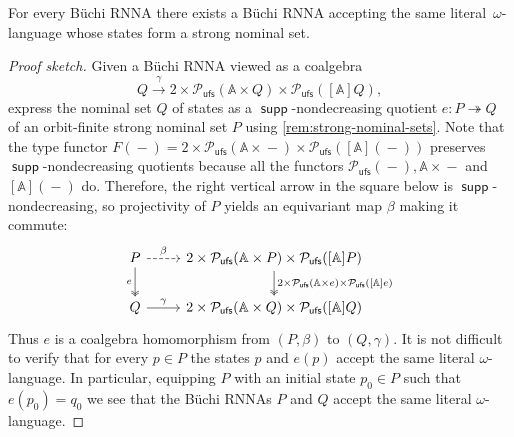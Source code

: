 \documentclass[10pt,a4paper]{amsart}
\numberwithin{equation}{section}
\newcommand{\epito}{\twoheadrightarrow}
\newcommand{\xto}[1]{\xrightarrow{~#1~}}
\newcommand{\dash}{\mathop{-}}
\newcommand{\+}[1]{\mathcal{#1}\xspace}
\newcommand{\Pow}{\mathcal{P}}
\newcommand{\ufs}{{\mathsf{ufs}}}
\newcommand{\names}{\mathbb{A}}
\DeclareMathOperator{\supp}{\mathsf{supp}} %
\theoremstyle{definition}
\begin{document}
%
\begin{proposition}\label{prop:strong}
  For every Büchi RNNA there exists a Büchi RNNA accepting the same
  literal~$\omega$-lan\-guage whose states form a strong
  nominal set.
\end{proposition}
%
\begin{proof}[Proof sketch]
 Given a Büchi RNNA viewed as a coalgebra
    \[
      Q\xto{\gamma} 2\times \Pow_\ufs(\names\times Q)\times
      \Pow_\ufs([\names]Q),
    \]
    express the nominal set $Q$ of states as a $\supp$-nondecreasing
    quotient $e\colon P\epito Q$ of an orbit-finite strong nominal set
    $P$ using \autoref{rem:strong-nominal-sets}. Note that the type
    functor
    $F(\dash) = 2\times \Pow_\ufs(\names\times \dash)\times
    \Pow_\ufs([\names](\dash))$ preserves $\supp$-nondecreasing quotients
    because all the functors
    $\Pow_\ufs(\dash), \names\times \dash$ and $[\names](\dash)$
    do. Therefore, the right vertical arrow in the square below is
    $\supp$-nondecreasing, so projectivity of $P$ yields an equivariant
    map $\beta$ making it commute:
\[
      \begin{tikzcd}
        P \ar[d,"e"', two heads] \ar[dashed]{r}{\beta}
        &
        2\times \Pow_\ufs(\names\times P)\times \Pow_\ufs([\names]P)
        \ar[d,"2\times \Pow_\ufs(\names\times e)\times
        \Pow_\ufs({[\names]}e)", two heads]
        \\
        Q \ar[r,"\gamma"]
        &
        2\times \Pow_\ufs(\names\times Q)\times \Pow_\ufs([\names]Q) 
      \end{tikzcd}
\]
    Thus $e$ is a coalgebra homomorphism from $(P,\beta)$ to
    $(Q,\gamma)$. It is not difficult to verify that for every $p\in P$ the states $p$ and $e(p)$ accept the same literal $\omega$-language. In particular, equipping $P$ with an initial state $p_0\in P$  such that $e(p_0)=q_0$ we see that the Büchi RNNAs $P$ and $Q$ accept the same literal $\omega$-language.
\end{proof}
%
\end{document}
